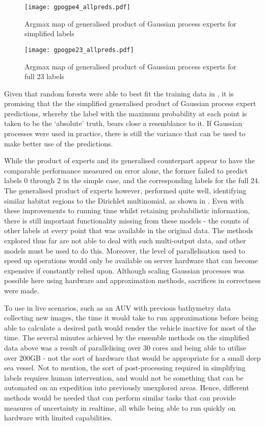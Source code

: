 \begin{figure}[H]
    \begin{minipage}{\linewidth}
    \texttt{[image: gpogpe4\_allpreds.pdf]}
    \caption{Argmax map of generalised product of Gaussian process experts for simplified labels}
    \label{fig:gpogpe4}
    \end{minipage}
    \begin{minipage}{\linewidth}
    \texttt{[image: gpogpe23\_allpreds.pdf]}
    \caption{Argmax map of generalised product of Gaussian process experts for full 23 labels }
    \label{fig:gpogpe23}
    \end{minipage}
\end{figure}

Given that random forests were able to best fit the training data in , it is promising that the the simplified generalised product of Gaussian process expert predictions, whereby the label with the maximum probability at each point is taken to be the `absolute' truth, bears close a resemblance to it. If Gaussian processes were used in practice, there is still the variance that can be used to make better use of the predictions. 

While the product of experts and its generalised counterpart appear to have the comparable performance measured on error alone, the former failed to predict labels $0$ through $2$ in the simple case, and the corresponding labels for the full $24$. The generalised product of experts however, performed quite well, identifying similar habitat regions to the Dirichlet multinomial, as shown in . Even with these improvements to running time whilst retaining probabilistic information, there is still important functionality missing from these models - the counts of other labels at every point that was available in the original data. The methods explored thus far are not able to deal with such multi-output data, and other models must be used to do this. Moreover, the level of parallelisation used to speed up operations would only be available on server hardware that can become expensive if constantly relied upon. Although scaling Gaussian processes was possible here using hardware and approximation methods, sacrifices in correctness were made. 

To use in live scenarios, such as an AUV with previous bathymetry data collecting new images, the time it would take to run approximations before being able to calculate a desired path would render the vehicle inactive for most of the time. The several minutes achieved by the ensemble methods on the simplified data above was a result of parallelising over $30$ cores and being able to utilise over $200$GB - not the sort of hardware that would be appropriate for a small deep sea vessel. Not to mention, the sort of post-processing required in simplifying labels requires human intervention, and would not be something that can be automated on an expedition into previously unexplored areas. Hence, different methods would be needed that can perform similar tasks that can provide measures of uncertainty in realtime, all while being able to run quickly on hardware with limited capabilities.
